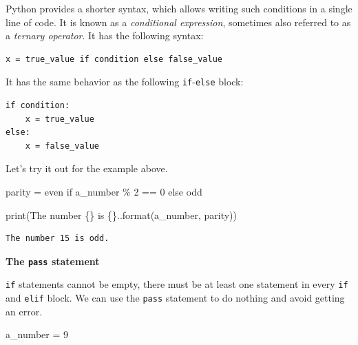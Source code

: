 \documentclass[
  letterpaper,
  DIV=11,
  numbers=noendperiod]{scrreprt}
\newenvironment{Shaded}{\begin{snugshade}}{\end{snugshade}}
\newcommand{\BuiltInTok}[1]{\textcolor[rgb]{0.00,0.23,0.31}{#1}}
\newcommand{\ControlFlowTok}[1]{\textcolor[rgb]{0.00,0.23,0.31}{#1}}
\newcommand{\DecValTok}[1]{\textcolor[rgb]{0.68,0.00,0.00}{#1}}
\newcommand{\NormalTok}[1]{\textcolor[rgb]{0.00,0.23,0.31}{#1}}
\newcommand{\OperatorTok}[1]{\textcolor[rgb]{0.37,0.37,0.37}{#1}}
\newcommand{\SpecialCharTok}[1]{\textcolor[rgb]{0.37,0.37,0.37}{#1}}
\newcommand{\StringTok}[1]{\textcolor[rgb]{0.13,0.47,0.30}{#1}}
\begin{document}
Python provides a shorter syntax, which allows writing such conditions
in a single line of code. It is known as a \emph{conditional
expression}, sometimes also referred to as a \emph{ternary operator}. It
has the following syntax:

\begin{verbatim}
x = true_value if condition else false_value
\end{verbatim}

It has the same behavior as the following \texttt{if}-\texttt{else}
block:

\begin{verbatim}
if condition:
    x = true_value
else:
    x = false_value
\end{verbatim}

Let's try it out for the example above.

\begin{Shaded}
\begin{Highlighting}[]
\NormalTok{parity }\OperatorTok{=} \StringTok{\textquotesingle{}even\textquotesingle{}} \ControlFlowTok{if}\NormalTok{ a\_number }\OperatorTok{\%} \DecValTok{2} \OperatorTok{==} \DecValTok{0} \ControlFlowTok{else} \StringTok{\textquotesingle{}odd\textquotesingle{}}
\end{Highlighting}
\end{Shaded}

\begin{Shaded}
\begin{Highlighting}[]
\BuiltInTok{print}\NormalTok{(}\StringTok{\textquotesingle{}The number }\SpecialCharTok{\{\}}\StringTok{ is }\SpecialCharTok{\{\}}\StringTok{.\textquotesingle{}}\NormalTok{.}\BuiltInTok{format}\NormalTok{(a\_number, parity))}
\end{Highlighting}
\end{Shaded}

\begin{verbatim}
The number 15 is odd.
\end{verbatim}

\textbf{The \texttt{pass} statement}

\texttt{if} statements cannot be empty, there must be at least one
statement in every \texttt{if} and \texttt{elif} block. We can use the
\texttt{pass} statement to do nothing and avoid getting an error.

\begin{Shaded}
\begin{Highlighting}[]
\NormalTok{a\_number }\OperatorTok{=} \DecValTok{9}
\end{Highlighting}
\end{Shaded}
\end{document}
